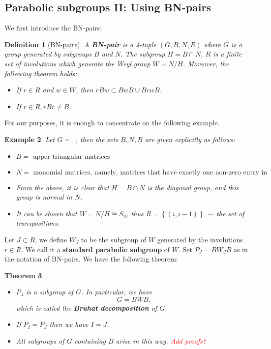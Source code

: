 \documentclass[12pt]{article} %
\newtheorem{definition}{Definition}[section]
\newtheorem{theorem}[definition]{Theorem}
\newtheorem{example}[definition]{Example}
\DeclareMathOperator{\GLn}{\text{GL}_n(\mathbb{R})}
\begin{document}
\subsection{Parabolic subgroups II: Using BN-pairs}
We first introduce the BN-pairs:
\begin{definition}[BN-pairs]
    A \textbf{BN-pair} is a 4-tuple $(G,B,N,R)$ where $G$ is a group generated by subgroups $B$ and $N$.
    The subgroup $H = B \cap N$, $R$ is a finite set of involutions which generate the \textit{Weyl group} $W= N/H$. Moreover,
    the following theorem holds:
    \begin{itemize}
        \item If $ r \in R$ and $w \in W$, then $rBw \subset BwB \cup BrwB$.
        \item If $r \in R, rBr \ne B$.
    \end{itemize}
\end{definition}
For our purposes, it is enough to concentrate on the following example.
\begin{example}
    Let $G = \GLn$, then the sets $B,N,R$ are given explicitly as follows:
    \begin{itemize}
        \item $B = \text{ upper triangular matrices}$
        \item $N = \text{ monomial matrices, namely, matrices that have exactly one non-zero entry in each row and column}$
        \item From the above, it is clear that $H = B \cap N$ is the diagonal group, and this group is normal in $N$.
        \item It can be shown that $W = N/H \cong S_n$, thus $R = \left\lbrace (i,i-1)\right\rbrace $ — the set of transpositions.
    \end{itemize}
\end{example}
Let $J \subset R$, we define $W_J$ to be the subgroup of $W$ generated by the involutions
$r \in R$. We call it a \textbf{standard parabolic subgroup} of $W$. Set $P_J = BW_JB$ as in the notation of
BN-pairs. We have the following theorem:
\begin{theorem}
    \hfill
    \begin{itemize}
        \item $P_J$ is a subgroup of $G$. In particular, we have
              \[G = BWB,\]
              which is called the \textbf{Bruhat decomposition} of $G$.
        \item If $P_I=P_J$ then we have $I=J$.
        \item All subgroups of $G$ containing $B$ arise in this way. \textcolor{red}{Add proofs?}
    \end{itemize}
\end{theorem}
\end{document}
